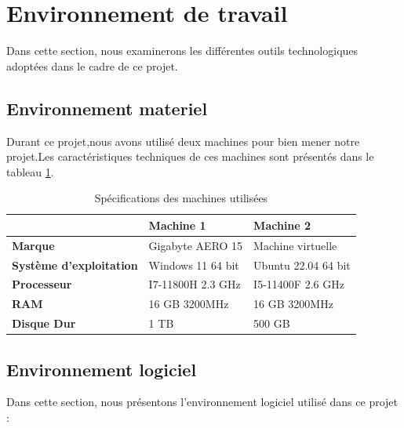 \section{Environnement de travail}
Dans cette section, nous examinerons les différentes outils technologiques adoptées dans le cadre de ce projet.
\newpage
\subsection{Environnement materiel}
Durant ce projet,nous avons utilisé deux machines pour bien mener notre projet.Les caractéristiques techniques de ces machines sont présentés dans le tableau \ref{tab:specs}.

\begin{table}[h!]
\centering
\caption{Spécifications des machines utilisées}
\label{tab:specs}
\begin{tabularx}{\linewidth}{|X|X|X|}
\hline
\textbf{} & \textbf{Machine 1} & \textbf{Machine 2} \\
\hline
\textbf{Marque} & Gigabyte AERO 15 & Machine virtuelle \\
\hline
\textbf{Système d’exploitation} & Windows 11 64 bit & Ubuntu 22.04 64 bit \\
\hline
\textbf{Processeur} & I7-11800H 2.3 GHz & I5-11400F 2.6 GHz \\
\hline
\textbf{RAM} & 16 GB 3200MHz & 16 GB 3200MHz \\
\hline
\textbf{Disque Dur} & 1 TB & 500 GB \\
\hline
\end{tabularx}
\end{table}
\subsection{Environnement logiciel}
Dans cette section, nous présentons l’environnement logiciel utilisé dans ce projet :

